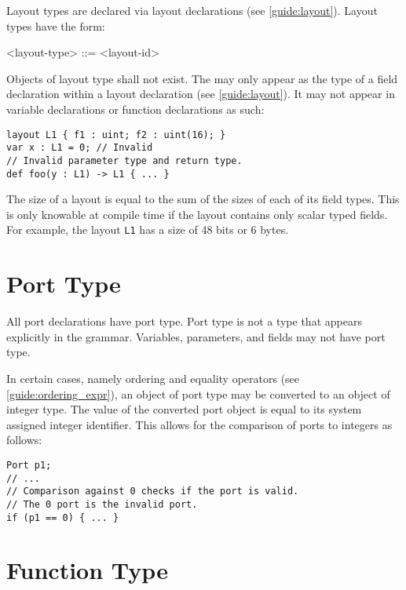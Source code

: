 Layout types are declared via layout declarations (see \ref{guide:layout}). Layout types have the form:

\begin{minip}
\begin{grammar}
<layout-type> ::= <layout-id>
\end{grammar}
\end{minip}

Objects of layout type shall not exist. The  may only appear as the type of a field declaration within a layout declaration (see \ref{guide:layout}). It may not appear in variable declarations or function declarations as such:

\begin{minip}
\begin{lstlisting}
layout L1 { f1 : uint; f2 : uint(16); }
var x : L1 = 0; // Invalid
// Invalid parameter type and return type.
def foo(y : L1) -> L1 { ... }
\end{lstlisting}
\end{minip}

The size of a layout is equal to the sum of the sizes of each of its field types. This is only knowable at compile time if the layout contains only scalar typed fields. For example, the layout \texttt{L1} has a size of 48 bits or 6 bytes.

\section{Port Type} \label{guide:port_type}

All port declarations have port type. Port type is not a type that appears explicitly in the grammar. Variables, parameters, and fields may not have port type.

In certain cases, namely ordering and equality operators (see \ref{guide:ordering_expr}), an object of port type may be converted to an object of integer type. The value of the converted port object is equal to its system assigned integer identifier. This allows for the comparison of ports to integers as follows:

\begin{minip}
\begin{lstlisting}
Port p1;
// ...
// Comparison against 0 checks if the port is valid.
// The 0 port is the invalid port.
if (p1 == 0) { ... }
\end{lstlisting}
\end{minip}

\section{Function Type} \label{guide:function_type}


